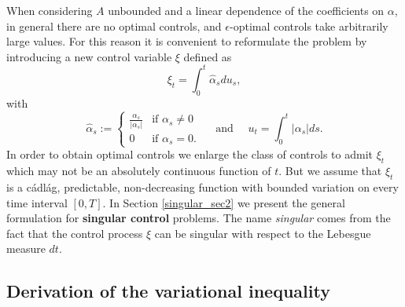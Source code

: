 When considering $A$ unbounded and a linear dependence of the coefficients on $\alpha$, in general there are no optimal controls, and 
$\epsilon$-optimal controls take arbitrarily large values.
For this reason it is convenient to reformulate the problem by introducing a new control variable $\xi$ defined as
\begin{equation}
 \xi_t = \int_0^t \hat \alpha_s du_s,
\end{equation}
with 
\begin{equation}
 \hat \alpha_s := \begin{cases} 
\frac{\alpha_s}{|\alpha_s|} & \mbox{if } \alpha_s \not= 0 \\ 
0 & \mbox{if } \alpha_s = 0 . 
\end{cases} 
\quad \mbox{ and } \quad
u_t = \int_0^t |\alpha_s| ds.
\end{equation}
In order to obtain optimal controls we enlarge the class of controls to admit $\xi_t$ which may not be an absolutely continuous function of $t$.
But we assume that $\xi_t$ is a cádlág, predictable, non-decreasing function with bounded variation on every time interval $[0,T]$.
In Section \ref{singular_sec2} we present the general formulation for \textbf{singular control} problems.
The name \emph{singular} comes from the fact that the control process $\xi$ can be singular with respect to the Lebesgue measure $dt$.

\subsection{Derivation of the variational inequality}\label{singular_sec1}

